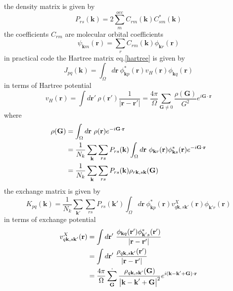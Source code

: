 \documentclass{article}
\begin{document}
            the density matrix is given by
            \begin{equation}
                P_{rs}(\textbf{k}) = 2\sum_m^{occ}C_{rm}(\textbf{k})C_{sm}^*(\textbf{k})
            \end{equation}
            the coefficients $C_{rm}$ are molecular orbital coefficients
            \begin{equation}
                \psi_{\textbf{k}m}(\textbf{r}) = \sum_{r}C_{rm}(\textbf{k})\phi_{\textbf{k}r}(\textbf{r})
            \end{equation} 
            in practical code the Hartree matrix eq.\eqref{hartree} is given by
            \begin{equation}
                J_{pq}(\textbf{k}) = \int_{\Omega}d\textbf{r}\ \phi_{\textbf{k}p}^*(\textbf{r})
                v_H(\textbf{r})\phi_{\textbf{k}q}(\textbf{r})\label{hartree_code}
            \end{equation}
            in terms of Hartree potential
            \begin{equation}
                v_H(\textbf{r}) = \int d\textbf{r}'\ \rho(\textbf{r}')\frac{1}{\left|\textbf{r}-\textbf{r}'\right|} 
                = \frac{4\pi}{\Omega}\sum_{\textbf{G}\neq 0}\frac{\rho(\textbf{G})}{G^2}e^{i\textbf{G}\cdot\textbf{r}}
            \end{equation}
            where
            \begin{align}
                \rho(\textbf{G}) &= \int_{\Omega}d\textbf{r}\ \rho(\textbf{r})e^{-i\textbf{G}\cdot\textbf{r}}\notag\\
                &= \frac{1}{N_k}\sum_{\textbf{k}}\sum_{rs}P_{rs}(\textbf{k})\int_{\Omega}d\textbf{r}\ 
                    \phi_{\textbf{k}r}(\textbf{r})\phi_{\textbf{k}s}^*(\textbf{r})e^{-i\textbf{G}\cdot\textbf{r}}\notag\\
                &= \frac{1}{N_k}\sum_{\textbf{k}}\sum_{rs}P_{rs}(\textbf{k})\rho_{r\textbf{k},s\textbf{k}}(\textbf{G})
            \end{align}
            the exchange matrix is given by
            \begin{equation}
                K_{pq}(\textbf{k}) = \frac{1}{N_k}\sum_{\textbf{k}'}\sum_{rs}P_{rs}(\textbf{k}')\int_{\Omega} d\textbf{r}\ 
                \phi_{\textbf{k}p}^*(\textbf{r})v_{q\textbf{k},s\textbf{k}'}^X(\textbf{r})\phi_{\textbf{k}'r}(\textbf{r})
            \end{equation}
            in terms of exchange potential
            \begin{align}
                v_{q\textbf{k},s\textbf{k}'}^X(\textbf{r}) 
                &= \int d\textbf{r}'\ \frac{\phi_{\textbf{k}q}(\textbf{r}')
                    \phi_{\textbf{k}'s}^*(\textbf{r}')}{\left|\textbf{r}-\textbf{r}'\right|}\notag\\
                &= \int d\textbf{r}'\ \frac{\rho_{q\textbf{k},s\textbf{k}'}(\textbf{r}')}{\left|\textbf{r}-\textbf{r}'\right|}\notag \\
                &= \frac{4\pi}{\Omega}\sum_{\textbf{G}}^{,}\frac{\rho_{q\textbf{k},s\textbf{k}'}(\textbf{G})}
                    {\left|\textbf{k}-\textbf{k}'+\textbf{G}\right|^2}e^{i(\textbf{k}-\textbf{k}'+\textbf{G})\cdot\textbf{r}}
            \end{align}
\end{document}
